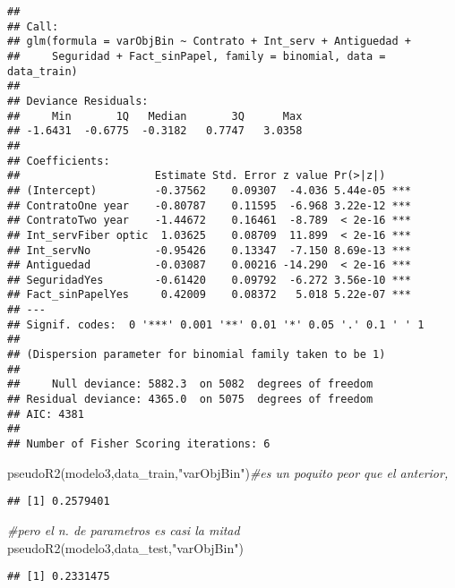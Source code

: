 \documentclass[
]{article}
\newenvironment{Shaded}{\begin{snugshade}}{\end{snugshade}}
\newcommand{\CommentTok}[1]{\textcolor[rgb]{0.56,0.35,0.01}{\textit{#1}}}
\newcommand{\FunctionTok}[1]{\textcolor[rgb]{0.00,0.00,0.00}{#1}}
\newcommand{\NormalTok}[1]{#1}
\newcommand{\SpecialCharTok}[1]{\textcolor[rgb]{0.00,0.00,0.00}{#1}}
\newcommand{\StringTok}[1]{\textcolor[rgb]{0.31,0.60,0.02}{#1}}
\begin{document}
\begin{verbatim}
## 
## Call:
## glm(formula = varObjBin ~ Contrato + Int_serv + Antiguedad + 
##     Seguridad + Fact_sinPapel, family = binomial, data = data_train)
## 
## Deviance Residuals: 
##     Min       1Q   Median       3Q      Max  
## -1.6431  -0.6775  -0.3182   0.7747   3.0358  
## 
## Coefficients:
##                     Estimate Std. Error z value Pr(>|z|)    
## (Intercept)         -0.37562    0.09307  -4.036 5.44e-05 ***
## ContratoOne year    -0.80787    0.11595  -6.968 3.22e-12 ***
## ContratoTwo year    -1.44672    0.16461  -8.789  < 2e-16 ***
## Int_servFiber optic  1.03625    0.08709  11.899  < 2e-16 ***
## Int_servNo          -0.95426    0.13347  -7.150 8.69e-13 ***
## Antiguedad          -0.03087    0.00216 -14.290  < 2e-16 ***
## SeguridadYes        -0.61420    0.09792  -6.272 3.56e-10 ***
## Fact_sinPapelYes     0.42009    0.08372   5.018 5.22e-07 ***
## ---
## Signif. codes:  0 '***' 0.001 '**' 0.01 '*' 0.05 '.' 0.1 ' ' 1
## 
## (Dispersion parameter for binomial family taken to be 1)
## 
##     Null deviance: 5882.3  on 5082  degrees of freedom
## Residual deviance: 4365.0  on 5075  degrees of freedom
## AIC: 4381
## 
## Number of Fisher Scoring iterations: 6
\end{verbatim}

\begin{Shaded}
\begin{Highlighting}[]
\FunctionTok{pseudoR2}\NormalTok{(modelo3,data\_train,}\StringTok{"varObjBin"}\NormalTok{)}\CommentTok{\#es un poquito peor que el anterior,}
\end{Highlighting}
\end{Shaded}

\begin{verbatim}
## [1] 0.2579401
\end{verbatim}

\begin{Shaded}
\begin{Highlighting}[]
\CommentTok{\#pero el n. de parametros es casi la mitad}
\FunctionTok{pseudoR2}\NormalTok{(modelo3,data\_test,}\StringTok{"varObjBin"}\NormalTok{)}
\end{Highlighting}
\end{Shaded}

\begin{verbatim}
## [1] 0.2331475
\end{verbatim}

\begin{Shaded}
\end{Shaded}
\end{document}
